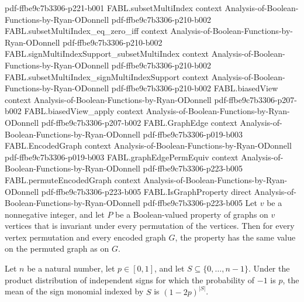 \begin{theorem}
  {pdf-ffbe9c7b3306-p221-b001}
\proofstep
  {FABL.subsetMultiIndex}
  {context}
  {Analysis-of-Boolean-Functions-by-Ryan-ODonnell}
  {pdf-ffbe9c7b3306-p210-b002}
\proofstep
  {FABL.subsetMultiIndex_eq_zero_iff}
  {context}
  {Analysis-of-Boolean-Functions-by-Ryan-ODonnell}
  {pdf-ffbe9c7b3306-p210-b002}
\proofstep
  {FABL.signMultiIndexSupport_subsetMultiIndex}
  {context}
  {Analysis-of-Boolean-Functions-by-Ryan-ODonnell}
  {pdf-ffbe9c7b3306-p210-b002}
\proofstep
  {FABL.subsetMultiIndex_signMultiIndexSupport}
  {context}
  {Analysis-of-Boolean-Functions-by-Ryan-ODonnell}
  {pdf-ffbe9c7b3306-p210-b002}
\proofstep
  {FABL.biasedView}
  {context}
  {Analysis-of-Boolean-Functions-by-Ryan-ODonnell}
  {pdf-ffbe9c7b3306-p207-b002}
\proofstep
  {FABL.biasedView_apply}
  {context}
  {Analysis-of-Boolean-Functions-by-Ryan-ODonnell}
  {pdf-ffbe9c7b3306-p207-b002}
\proofstep
  {FABL.GraphEdge}
  {context}
  {Analysis-of-Boolean-Functions-by-Ryan-ODonnell}
  {pdf-ffbe9c7b3306-p019-b003}
\proofstep
  {FABL.EncodedGraph}
  {context}
  {Analysis-of-Boolean-Functions-by-Ryan-ODonnell}
  {pdf-ffbe9c7b3306-p019-b003}
\proofstep
  {FABL.graphEdgePermEquiv}
  {context}
  {Analysis-of-Boolean-Functions-by-Ryan-ODonnell}
  {pdf-ffbe9c7b3306-p223-b005}
\proofstep
  {FABL.permuteEncodedGraph}
  {context}
  {Analysis-of-Boolean-Functions-by-Ryan-ODonnell}
  {pdf-ffbe9c7b3306-p223-b005}
\proofstep
  {FABL.IsGraphProperty}
  {direct}
  {Analysis-of-Boolean-Functions-by-Ryan-ODonnell}
  {pdf-ffbe9c7b3306-p223-b005}
Let $v$ be a nonnegative integer, and let $P$ be a Boolean-valued property of graphs on
$v$ vertices that is invariant under every permutation of the vertices. Then for every
vertex permutation and every encoded graph $G$, the property has the same value on the
permuted graph as on $G$.
\end{theorem}

\begin{theorem}
\label{FABL.productMean_biasedSignPMF_monomial}
\leanok
{}
Let $n$ be a natural number, let $p\in[0,1]$, and let $S\subseteq\{0,\ldots,n-1\}$.
Under the product distribution of independent signs for which the probability of $-1$ is
$p$, the mean of the sign monomial indexed by $S$ is $(1-2p)^{|S|}$.
\end{theorem}


